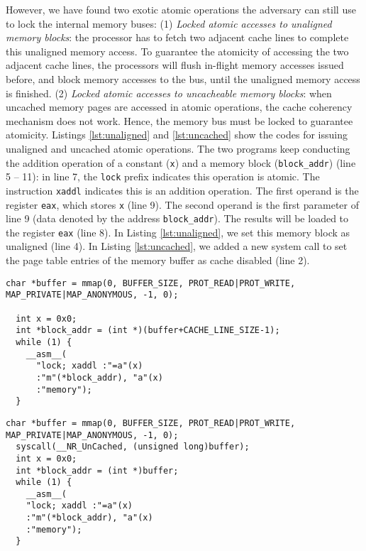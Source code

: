 \documentclass{sig-alternate}
\begin{document}
However, we have found two exotic atomic operations the adversary can still use to 
lock the internal memory buses: (1) \emph{Locked atomic accesses to unaligned 
memory blocks}: the processor has to fetch two adjacent cache lines to complete 
this unaligned memory access. To guarantee the atomicity of accessing the two 
adjacent cache lines, the processors will flush in-flight memory accesses issued 
before, and block memory accesses to the bus, until the unaligned memory access is 
finished. (2) \emph{Locked atomic accesses to uncacheable memory blocks}: when 
uncached memory pages are accessed in atomic operations, the cache coherency 
mechanism does not work. Hence, the memory bus must be locked to guarantee atomicity. 
Listings \ref{lst:unaligned} and \ref{lst:uncached} show the codes for issuing unaligned 
and uncached atomic operations. The two programs keep conducting the addition 
operation of a constant (\texttt{x}) and a memory block (\texttt{block\_addr}) 
(line 5 -- 11): in line 7, the \texttt{lock} prefix indicates this operation is atomic. 
The instruction \texttt{xaddl} indicates this is an addition operation. The first operand
is the register \texttt{eax}, which stores \texttt{x} (line 9). The second operand is 
the first parameter of line 9 (data denoted by the address \texttt{block\_addr}). The 
results will be loaded to the register \texttt{eax} (line 8). 
In Listing \ref{lst:unaligned}, we set this memory block as unaligned (line 
4). In Listing \ref{lst:uncached}, we added a new system call to set the page 
table entries of the memory buffer as cache disabled (line 2).


\begin{figure*}[t]
  \centering
  \begin{minipage}{.46\textwidth}
\begin{lstlisting}[caption={Attack using unaligned atomic operations}, label={lst:unaligned}]
  char *buffer = mmap(0, BUFFER_SIZE, PROT_READ|PROT_WRITE, MAP_PRIVATE|MAP_ANONYMOUS, -1, 0);

  int x = 0x0;
  int *block_addr = (int *)(buffer+CACHE_LINE_SIZE-1);
  while (1) {
    __asm__(
      "lock; xaddl :"=a"(x)
      :"m"(*block_addr), "a"(x)
      :"memory"); 
  }
\end{lstlisting}  
\end{minipage}
  \begin{minipage}{.46\textwidth}
\begin{lstlisting}[caption={Attack using uncached atomic operations}, label={lst:uncached}]
  char *buffer = mmap(0, BUFFER_SIZE, PROT_READ|PROT_WRITE, MAP_PRIVATE|MAP_ANONYMOUS, -1, 0);
  syscall(__NR_UnCached, (unsigned long)buffer);
  int x = 0x0;
  int *block_addr = (int *)buffer;
  while (1) {
    __asm__(
    "lock; xaddl :"=a"(x)
    :"m"(*block_addr), "a"(x)
    :"memory"); 
  }
\end{lstlisting}
  \end{minipage}
  \vspace{-15pt}
\end{figure*}
\end{document}
